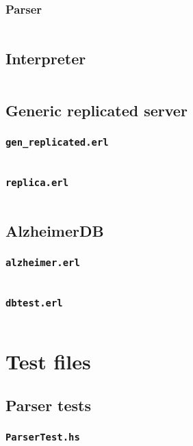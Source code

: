 \documentclass[a4paper]{article}
\begin{document}
\subsubsection{Parser}
\label{SubsParser.hs}
\inputminted{haskell}{../src/subs/SubsParser.hs}
\subsection{Interpreter}
\label{SubsInterpreter.hs}
\inputminted{haskell}{../src/subs/SubsInterpreter.hs}
\subsection{Generic replicated server}
\label{sub:Generic replicated server}
\subsubsection{\texttt{gen\_replicated.erl}}
\label{genreplicated.erl}
\inputminted{erlang}{../src/alzheimer/gen_replicated.erl}
\subsubsection{\texttt{replica.erl}}
\label{replica.erl}
\inputminted{erlang}{../src/alzheimer/replica.erl}
\subsection{AlzheimerDB}
\label{sub:AlzheimerDB}
\subsubsection{\texttt{alzheimer.erl}}
\label{alzheimer.erl}
\inputminted{erlang}{../src/alzheimer/alzheimer.erl}
\subsubsection{\texttt{dbtest.erl}}
\label{dbtest.erl}
\inputminted{erlang}{../src/alzheimer/dbtest.erl}
\section{Test files}
\label{sec:Test files}
\subsection{Parser tests}
\label{Parsertests}
\subsubsection{\texttt{ParserTest.hs}}
\label{parserUnit}
\inputminted{haskell}{../src/subs/ParserTest.hs}
\end{document}
